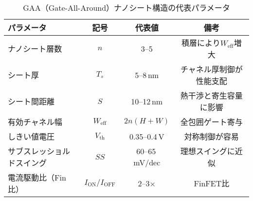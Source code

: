 \begin{table}[t]
  \centering
  \caption{GAA（Gate-All-Around）ナノシート構造の代表パラメータ}
  \label{tab:gaa_params}
  \begin{tabular}{lccc}
    \toprule
    パラメータ & 記号 & 代表値 & 備考 \\
    \midrule
    ナノシート層数 & $n$ & 3–5 & 積層により$W_\mathrm{eff}$増大 \\
    シート厚 & $T_s$ & 5–8\,nm & チャネル厚制御が性能支配 \\
    シート間距離 & $S$ & 10–12\,nm & 熱干渉と寄生容量に影響 \\
    有効チャネル幅 & $W_\mathrm{eff}$ & $2n(H+W)$ & 全包囲ゲート寄与 \\
    しきい値電圧 & $V_\mathrm{th}$ & 0.35–0.4\,V & 対称制御が容易 \\
    サブスレッショルドスイング & $SS$ & 60–65\,mV/dec & 理想スイングに近似 \\
    電流駆動比（Fin比） & $I_\mathrm{ON}/I_\mathrm{OFF}$ & 2–3× & FinFET比 \\
    \bottomrule
  \end{tabular}
\end{table}
